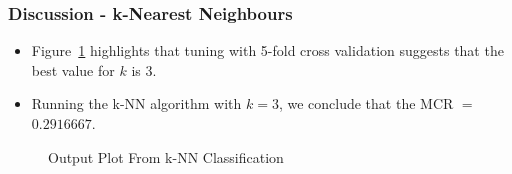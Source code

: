 \documentclass{beamer}
\begin{document}
\begin{frame}
    \frametitle{Discussion - k-Nearest Neighbours}
        \begin{itemize}
            \setlength\itemsep{1em}
            \item Figure~\ref{fig:KNNPlot} highlights that tuning with 5-fold cross validation suggests that the best value for $k$ is $3$.
            \item Running the k-NN algorithm with $k=3$, we conclude that the MCR $=$ $0.2916667.$
        \end{itemize}
        \begin{figure}[h!]
            \centering
            \caption{Output Plot From k-NN Classification} 
            \label{fig:KNNPlot}
        \end{figure}
\end{frame}
\end{document}
